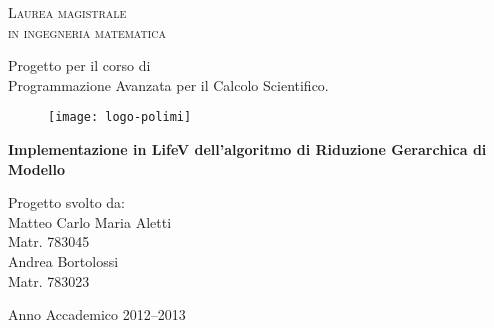 \begin{titlepage}
\begin{center}
    { \scshape 
    Laurea magistrale\\
    in ingegneria matematica\\
    }
\end{center}
\vspace{1.2cm}
\begin{flushleft}
		\Large
		Progetto per il corso di \\
		Programmazione Avanzata per il Calcolo Scientifico.\\
		\vspace{1.5cm}
\end{flushleft}
\begin{figure}[h]
		\centering
		\texttt{[image: logo-polimi]}
		\vspace{1cm}
\end{figure}
\begin{center}
{ \bfseries  {\Large Implementazione in LifeV dell'algoritmo di Riduzione Gerarchica di Modello}\\
\vspace{0.2cm} }
\end{center}
\vspace{0.4cm}
\begin{flushright}
		\Large
		Progetto svolto da:\\
		Matteo Carlo Maria Aletti\\
		Matr. 783045\\
		Andrea Bortolossi\\
		Matr. 783023\\
		\vspace{1.5cm}
\end{flushright}
\begin{center}
Anno Accademico 2012--2013
\end{center}

\end{titlepage}